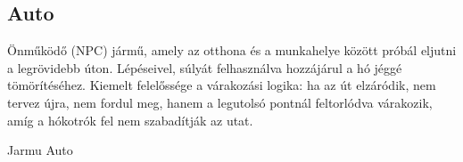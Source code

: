 \subsection{Auto}
\begin{class-template-responsibility}
    Önműködő (NPC) jármű, amely az otthona és a munkahelye között próbál eljutni a legrövidebb úton. Lépéseivel, súlyát felhasználva hozzájárul a hó jéggé tömörítéséhez. Kiemelt felelőssége a várakozási logika: ha az út elzáródik, nem tervez újra, nem fordul meg, hanem a legutolsó pontnál feltorlódva várakozik, amíg a hókotrók fel nem szabadítják az utat.\end{class-template-responsibility}
\begin{class-template-baseclass}
    Jarmu \baseclass Auto
\end{class-template-baseclass}
\begin{class-template-attribute}
\end{class-template-attribute}
